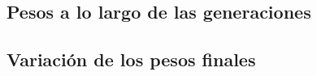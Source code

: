 \subsection{Pesos a lo largo de las generaciones} \label{sec:pesos_a_lo_largo_generaciones_lideres}


\subsection{Variación de los pesos finales} \label{sec:variacion_pesos_finales_lideres}





